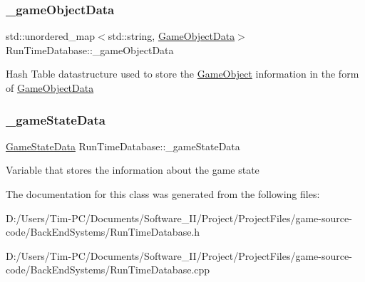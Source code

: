\subsubsection{\texorpdfstring{\+\_\+game\+Object\+Data}{\_gameObjectData}}
{\footnotesize\ttfamily std\+::unordered\+\_\+map$<$std\+::string, \hyperlink{struct_game_object_data}{Game\+Object\+Data}$>$ Run\+Time\+Database\+::\+\_\+game\+Object\+Data\hspace{0.3cm}{\ttfamily [protected]}}

Hash Table datastructure used to store the \hyperlink{class_game_object}{Game\+Object} information in the form of \hyperlink{struct_game_object_data}{Game\+Object\+Data} \mbox{\label{class_run_time_database_a1d965e094a4035d1a6c28a566a29cb8e}} 
\subsubsection{\texorpdfstring{\+\_\+game\+State\+Data}{\_gameStateData}}
{\footnotesize\ttfamily \hyperlink{struct_game_state_data}{Game\+State\+Data} Run\+Time\+Database\+::\+\_\+game\+State\+Data\hspace{0.3cm}{\ttfamily [protected]}}

Variable that stores the information about the game state 

The documentation for this class was generated from the following files\+:\begin{DoxyCompactItemize}
\item 
D\+:/\+Users/\+Tim-\/\+P\+C/\+Documents/\+Software\+\_\+\+I\+I/\+Project/\+Project\+Files/game-\/source-\/code/\+Back\+End\+Systems/Run\+Time\+Database.\+h\item 
D\+:/\+Users/\+Tim-\/\+P\+C/\+Documents/\+Software\+\_\+\+I\+I/\+Project/\+Project\+Files/game-\/source-\/code/\+Back\+End\+Systems/Run\+Time\+Database.\+cpp\end{DoxyCompactItemize}
